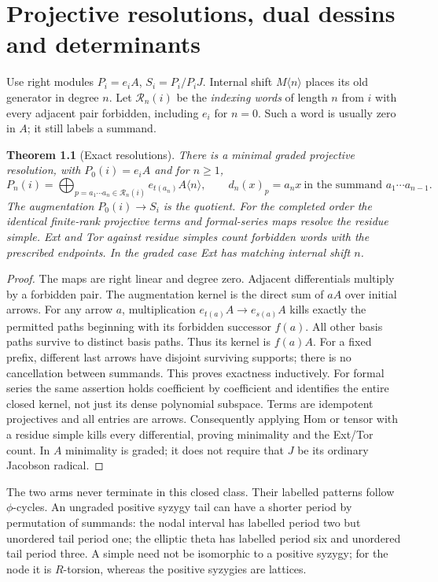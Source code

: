 \documentclass[11pt,oneside,openany]{book}
\newtheorem{theorem}{Theorem}[chapter]
\theoremstyle{definition}\newtheorem{definition}[theorem]{Definition}
\theoremstyle{remark}\newtheorem{remark}[theorem]{Remark}
\newcommand{\gshift}[2]{#1\langle #2\rangle}
\begin{document}
\chapter{Projective resolutions, dual dessins and determinants}
Use right modules $P_i=e_iA$, $S_i=P_i/P_iJ$. Internal shift $\gshift{M}{n}$ places its old generator in degree $n$. Let $\mathcal R_n(i)$ be the \emph{indexing words} of length $n$ from $i$ with every adjacent pair forbidden, including $e_i$ for $n=0$. Such a word is usually zero in $A$; it still labels a summand.
\begin{theorem}[Exact resolutions]\label{thm:resolution}
There is a minimal graded projective resolution, with $P_0(i)=e_iA$ and for $n\ge1$,
\[
 P_n(i)=\bigoplus_{p=a_1\cdots a_n\in\mathcal R_n(i)}
 \gshift{e_{t(a_n)}A}{n},\qquad
 d_n(x)_p=a_nx\ \text{in the summand }a_1\cdots a_{n-1}.
\]
The augmentation $P_0(i)\to S_i$ is the quotient. For the completed order the identical finite-rank projective terms and formal-series maps resolve the residue simple. Ext and Tor against residue simples count forbidden words with the prescribed endpoints. In the graded case Ext has matching internal shift $n$.
\end{theorem}
\begin{proof}
The maps are right linear and degree zero. Adjacent differentials multiply by a forbidden pair. The augmentation kernel is the direct sum of $aA$ over initial arrows. For any arrow $a$, multiplication $e_{t(a)}A\to e_{s(a)}A$ kills exactly the permitted paths beginning with its forbidden successor $f(a)$. All other basis paths survive to distinct basis paths. Thus its kernel is $f(a)A$. For a fixed prefix, different last arrows have disjoint surviving supports; there is no cancellation between summands. This proves exactness inductively. For formal series the same assertion holds coefficient by coefficient and identifies the entire closed kernel, not just its dense polynomial subspace. Terms are idempotent projectives and all entries are arrows. Consequently applying Hom or tensor with a residue simple kills every differential, proving minimality and the Ext/Tor count. In $A$ minimality is graded; it does not require that $J$ be its ordinary Jacobson radical.
\end{proof}
The two arms never terminate in this closed class. Their labelled patterns follow $\phi$-cycles. An ungraded positive syzygy tail can have a shorter period by permutation of summands: the nodal interval has labelled period two but unordered tail period one; the elliptic theta has labelled period six and unordered tail period three. A simple need not be isomorphic to a positive syzygy; for the node it is $R$-torsion, whereas the positive syzygies are lattices.
\end{document}
